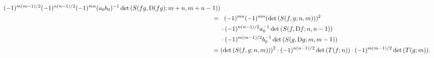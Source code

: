 \documentclass[../libro.tex]{subfiles}
\begin{document}
\begin{example}
\begin{align*}
        (-1)^{m(m-1)/2} (-1)^{n(n-1)/2} (-1)^{m n}
        (a_0 b_0)^{-1}
        \det {(S(f g, \mathrm{D} (f g); m + n, m + n - 1))}
        \\
        = {} &
        \hphantom{\cdot\,\,}
        (-1)^{m n} (-1)^{m n} (\det {(S(f, g; n, m))})^2
        \\
        &
        \cdot
        (-1)^{n(n-1)/2} a_0^{-1}
        \det {(S(f, \mathrm{D} f; n, n-1))}
        \\
        &
        \cdot
        (-1)^{m(m-1)/2} b_0^{-1}
        \det {(S(g, \mathrm{D} g; m, m-1))}
        \\
        = {} &
        (\det {(S(f, g; n, m))})^2
        \cdot
        (-1)^{n(n-1)/2} \det {(T(f; n))}
        \cdot
        (-1)^{m(m-1)/2} \det {(T(g; m))}.
        \qedhere
    \end{align*}
\end{example}
\end{document}

